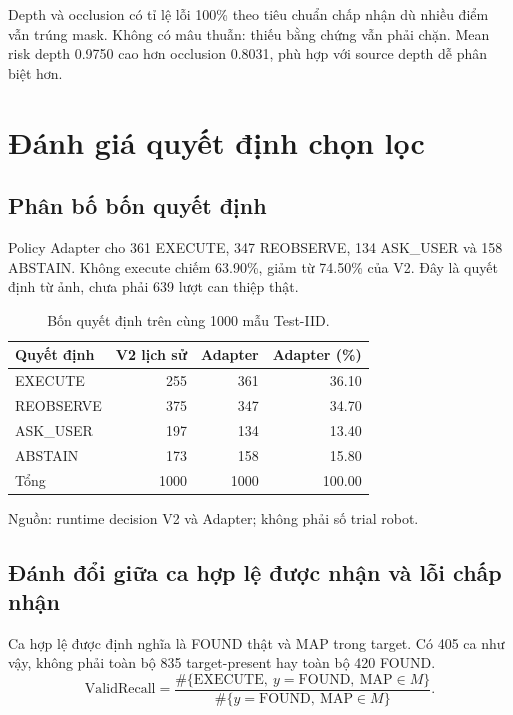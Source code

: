 Depth và occlusion có tỉ lệ lỗi 100\%
theo tiêu chuẩn chấp nhận dù nhiều
điểm vẫn trúng mask. Không có mâu
thuẫn: thiếu bằng chứng vẫn phải
chặn. Mean risk depth 0.9750 cao
hơn occlusion 0.8031, phù hợp với
source depth dễ phân biệt hơn.

\section{Đánh giá quyết định chọn lọc}
\label{sec:results-selective}

\subsection{Phân bố bốn quyết định}

Policy Adapter cho 361 EXECUTE, 347 REOBSERVE, 134 ASK\_USER
và 158 ABSTAIN. Không execute chiếm 63.90\%, giảm từ 74.50\%
của V2. Đây là quyết định từ ảnh, chưa phải 639 lượt can thiệp thật.

\begin{table}[htbp]
    \centering
    \setlength{\tabcolsep}{4pt}
    \renewcommand{\arraystretch}{1.15}
    \caption{Bốn quyết định trên cùng 1000 mẫu Test-IID.}
    \label{tab:results-policy-counts}
    \small
    \begin{tabularx}{\textwidth}{@{}>{\raggedright\arraybackslash}Xrrr@{}}
        \toprule
        Quyết định & V2 lịch sử & Adapter & Adapter (\%) \\
        \midrule
        EXECUTE & 255 & 361 & 36.10 \\
        REOBSERVE & 375 & 347 & 34.70 \\
        ASK\_USER & 197 & 134 & 13.40 \\
        ABSTAIN & 173 & 158 & 15.80 \\
        \midrule
        Tổng & 1000 & 1000 & 100.00 \\
        \bottomrule
    \end{tabularx}
    {\footnotesize\raggedright Nguồn: runtime decision V2 và Adapter; không phải số trial robot.\par}
\end{table}

\subsection{Đánh đổi giữa ca hợp lệ được nhận và lỗi chấp nhận}

Ca hợp lệ được định nghĩa là FOUND thật và MAP trong target. Có 405 ca
như vậy, không phải toàn bộ 835 target-present hay toàn bộ 420 FOUND.
\begin{equation}
    \mathrm{ValidRecall}=\frac{\#\{\mathrm{EXECUTE},\ y=\mathrm{FOUND},\ \mathrm{MAP}\in M\}}
    {\#\{y=\mathrm{FOUND},\ \mathrm{MAP}\in M\}}.
\end{equation}

